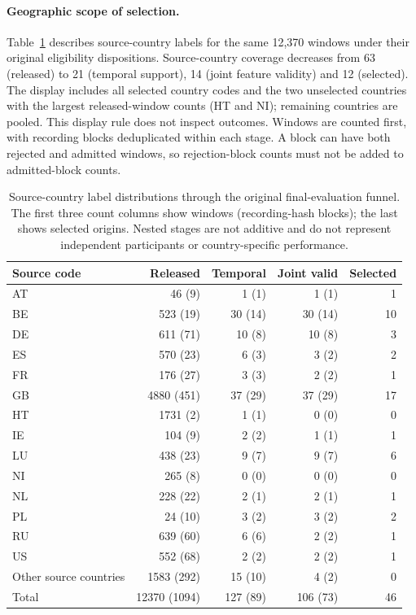 \paragraph{Geographic scope of selection.}\label{sec:final-cohort-geography}\hypertarget{sec:final-cohort-geography}{}
Table~\ref{tab:final-cohort-geography} describes source-country labels for
the same 12,370 windows under their original eligibility dispositions.
Source-country coverage decreases from 63 (released) to 21 (temporal support),
14 (joint feature validity) and 12 (selected).
The display includes all selected country codes and the two unselected
countries with the largest released-window counts (HT and NI); remaining
countries are pooled. This display rule does not inspect outcomes.
Windows are counted first, with recording blocks deduplicated within each stage.
A block can have both rejected and admitted windows, so rejection-block
counts must not be added to admitted-block counts.

\begin{table}[htbp]
\centering\small
\caption{Source-country label distributions through the original final-evaluation funnel. The first three count columns show windows (recording-hash blocks); the last shows selected origins. Nested stages are not additive and do not represent independent participants or country-specific performance.}
\label{tab:final-cohort-geography}\hypertarget{tab:final-cohort-geography}{}
\begin{tabular}{@{}lrrrr@{}}
\toprule
Source code & Released & Temporal & Joint valid & Selected\\
\midrule
AT & 46 (9) & 1 (1) & 1 (1) & 1\\
BE & 523 (19) & 30 (14) & 30 (14) & 10\\
DE & 611 (71) & 10 (8) & 10 (8) & 3\\
ES & 570 (23) & 6 (3) & 3 (2) & 2\\
FR & 176 (27) & 3 (3) & 2 (2) & 1\\
GB & 4880 (451) & 37 (29) & 37 (29) & 17\\
HT & 1731 (2) & 1 (1) & 0 (0) & 0\\
IE & 104 (9) & 2 (2) & 1 (1) & 1\\
LU & 438 (23) & 9 (7) & 9 (7) & 6\\
NI & 265 (8) & 0 (0) & 0 (0) & 0\\
NL & 228 (22) & 2 (1) & 2 (1) & 1\\
PL & 24 (10) & 3 (2) & 3 (2) & 2\\
RU & 639 (60) & 6 (6) & 2 (2) & 1\\
US & 552 (68) & 2 (2) & 2 (2) & 1\\
Other source countries & 1583 (292) & 15 (10) & 4 (2) & 0\\
Total & 12370 (1094) & 127 (89) & 106 (73) & 46\\
\bottomrule
\end{tabular}
\end{table}

